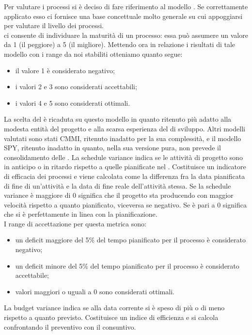 					Per valutare i processi si è deciso di fare riferimento al modello . Se correttamente applicato esso ci fornisce una base 
					concettuale molto generale su cui appoggiarsi per valutare il livello dei processi.\\
					 ci consente di individuare la maturità di un processo: essa può assumere un valore da 1 (il peggiore) a 5 (il migliore). Mettendo ora in relazione i risultati di tale modello con i range da noi stabiliti otteniamo quanto segue:
					\begin{itemize}
						\item il valore 1 è considerato negativo;
						\item i valori 2 e 3 sono considerati accettabili;
						\item i valori 4 e 5 sono considerati ottimali.
					\end{itemize}
					La scelta del  è ricaduta su questo modello in quanto ritenuto più adatto alla modesta entità del progetto e alla scarsa esperienza del  di sviluppo. Altri modelli valutati sono stati CMMI, ritenuto inadatto per la sua complessità, e il modello SPY, ritenuto inadatto in quanto, nella sua versione pura, non prevede il consolidamento delle .
La schedule variance indica se le attività di progetto sono in anticipo o in ritardo rispetto a quelle pianificate nel . Costituisce un indicatore di efficacia dei processi e viene calcolata come la differenza fra la data pianificata di fine di un'attività e la data di fine reale dell'attività stessa. Se la schedule variance è maggiore di 0 significa che il progetto sta producendo con maggior velocità rispetto a quanto pianificato, viceversa se negativo. Se è pari a 0 significa che si è perfettamente in linea con la pianificazione.\\
I range di accettazione per questa metrica sono:
\begin{itemize}
\item un deficit maggiore del 5\% del tempo pianificato per il processo è considerato negativo;
\item un deficit minore del 5\% del tempo pianificato per il processo è considerato accettabile;
\item valori maggiori o uguali a 0 sono considerati ottimali.
\end{itemize}
La budget variance indica se alla data corrente si è speso di più o di meno rispetto a quanto previsto. Costituisce un indice di efficienza e si calcola confrontando il preventivo con il consuntivo.\\
